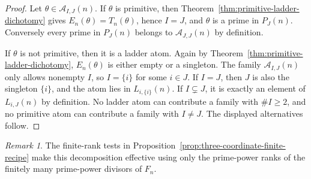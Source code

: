 \documentclass[11pt,letterpaper]{article}
\numberwithin{equation}{section}
\theoremstyle{plain}
\theoremstyle{definition}
\theoremstyle{remark}
\newtheorem{remark}[theorem]{Remark}
\begin{document}
\begin{proof}
Let \(\theta\in\mathcal A_{I,J}(n)\). If \(\theta\) is primitive, then
Theorem~\ref{thm:primitive-ladder-dichotomy} gives
\(E_n(\theta)=T_n(\theta)\), hence \(I=J\), and \(\theta\) is a prime in
\(P_J(n)\). Conversely every prime in \(P_J(n)\) belongs to
\(\mathcal A_{J,J}(n)\) by definition.

If \(\theta\) is not primitive, then it is a ladder atom. Again by
Theorem~\ref{thm:primitive-ladder-dichotomy}, \(E_n(\theta)\) is either empty
or a singleton. The family \(\mathcal A_{I,J}(n)\) only allows nonempty
\(I\), so \(I=\{i\}\) for some \(i\in J\). If \(I=J\), then \(J\) is also the
singleton \(\{i\}\), and the atom lies in \(L_{i,\{i\}}(n)\). If
\(I\subsetneq J\), it is exactly an element of
\(L_{i,J}(n)\) by definition. No ladder atom can contribute a family with
\(\#I\ge2\), and no primitive atom can contribute a family with \(I\ne J\).
The displayed alternatives follow.
\end{proof}

\begin{remark}
The finite-rank tests in Proposition~\ref{prop:three-coordinate-finite-recipe}
make this decomposition effective using only the prime-power ranks of the
finitely many prime-power divisors of \(F_n\).
\end{remark}
\end{document}
